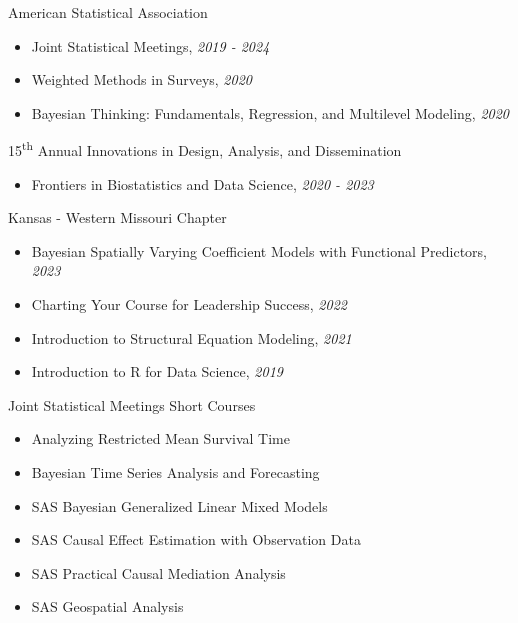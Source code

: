 
\Development
{American Statistical Association}
{\begin{itemize}
    \item Joint Statistical Meetings, \emph{2019 - 2024}
    \item Weighted Methods in Surveys, \emph{2020}
    \item Bayesian Thinking: Fundamentals, Regression, and Multilevel
        Modeling, \emph{2020}
\end{itemize}}

\vspace*{0.05 in}

\Development
{15\textsuperscript{th} Annual Innovations in Design, Analysis, and Dissemination}
{\begin{itemize}
    \item Frontiers in Biostatistics and Data Science, \emph{2020 - 2023}
\end{itemize}}

\vspace*{0.05 in}

\Development
{Kansas - Western Missouri Chapter}
{\begin{itemize}
     \item Bayesian Spatially Varying Coefficient Models with Functional Predictors, \emph{2023}
     \item Charting Your Course for Leadership Success, \emph{2022}
     \item Introduction to Structural Equation Modeling, \emph{2021}
     \item Introduction to R for Data Science, \emph{2019}
\end{itemize}}

\vspace*{0.05 in}

\Development
{Joint Statistical Meetings Short Courses}
{\begin{itemize}
    \item Analyzing Restricted Mean Survival Time
    \item Bayesian Time Series Analysis and Forecasting
    \item SAS Bayesian Generalized Linear Mixed Models
    \item SAS Causal Effect Estimation with Observation Data
    \item SAS Practical Causal Mediation Analysis
    \item SAS Geospatial Analysis
\end{itemize}}


